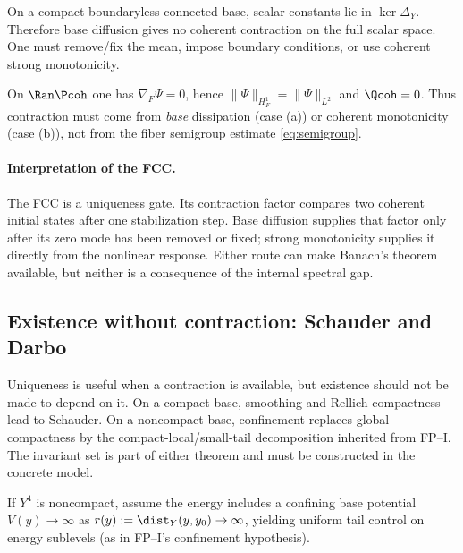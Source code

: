 \documentclass[11pt]{article}
\newcommand{\Yfour}{\ensuremath{Y^{4}}}
\newcommand{\HoneF}{\ensuremath{H^{1}_{F}}}
\newcommand{\Ltwo}{\ensuremath{L^{2}}}
\begin{document}
\begin{remark}
On a compact boundaryless connected base, scalar constants lie in
$\ker\Delta_Y$. Therefore base diffusion gives no coherent contraction on the
full scalar space. One must remove/fix the mean, impose boundary conditions, or
use coherent strong monotonicity.
\end{remark}

\begin{remark}
On $\Ran\Pcoh$ one has $\nabla_F\Psi=0$, hence $\|\Psi\|_{\HoneF}=\|\Psi\|_{\Ltwo}$ and
$\Qcoh=0$. Thus contraction must come from \emph{base} dissipation (case (a)) or coherent monotonicity (case (b)),
not from the fiber semigroup estimate \eqref{eq:semigroup}.
\end{remark}

\paragraph{Interpretation of the FCC.}
The FCC is a uniqueness gate.  Its contraction factor compares two coherent
initial states after one stabilization step.  Base diffusion supplies that
factor only after its zero mode has been removed or fixed; strong
monotonicity supplies it directly from the nonlinear response.  Either route
can make Banach's theorem available, but neither is a consequence of the
internal spectral gap.

\subsection{Existence without contraction: Schauder and Darbo}\label{subsec:exist}

Uniqueness is useful when a contraction is available, but existence should not
be made to depend on it.  On a compact base, smoothing and Rellich compactness
lead to Schauder.  On a noncompact base, confinement replaces global
compactness by the compact-local/small-tail decomposition inherited from
FP--I.  The invariant set is part of either theorem and must be constructed in
the concrete model.

\begin{assumption}\label{ass:conf}
If $\Yfour$ is noncompact, assume the energy includes a confining base potential $V(y)\to\infty$
as $r(y):=\dist_Y(y,y_0)\to\infty$, yielding uniform tail control on energy sublevels
(as in FP--I’s confinement hypothesis).
\end{assumption}
\end{document}
